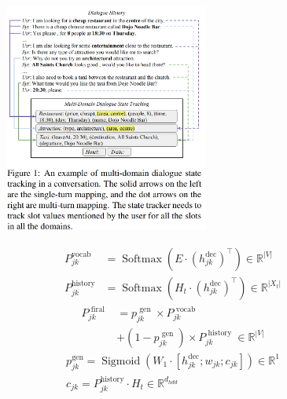 \documentclass[a4paper,UTF8]{article}
\numberwithin{equation}{section}
\begin{document}
\begin{figure}[H]
	\centering
	\includegraphics[width=0.6\textwidth]{5-1.png}
\end{figure}
\begin{equation}
\begin{aligned} P_{j k}^{\mathrm{vocab}} &=\operatorname{Softmax}\left(E \cdot\left(h_{j k}^{\mathrm{dec}}\right)^{\top}\right) \in \mathbb{R}^{|V|} \\ P_{j k}^{\mathrm{history}} &=\operatorname{Softmax}\left(H_{t} \cdot\left(h_{j k}^{\mathrm{dec}}\right)^{\top}\right) \in \mathbb{R}^{\left|X_{t}\right|} \end{aligned}
\end{equation}
\begin{equation}
\begin{aligned} P_{j k}^{\text { firal }} &=p_{j k}^{\text { gen }} \times P_{j k}^{\text { vocab }} \\ &+\left(1-p_{j k}^{\text { gen }}\right) \times P_{j k}^{\text { history }} \in \mathbb{R}^{|V|} \end{aligned}
\end{equation}
\begin{equation}
\begin{array}{c}{p_{j k}^{\mathrm{gen}}=\operatorname{Sigmoid}\left(W_{1} \cdot\left[h_{j k}^{\mathrm{dec}} ; w_{j k} ; c_{j k}\right]\right) \in \mathbb{R}^{1}} \\ {c_{j k}=P_{j k}^{\mathrm{history}} \cdot H_{t} \in \mathbb{R}^{d_{h d d}}}\end{array}
\end{equation}
\end{document}
